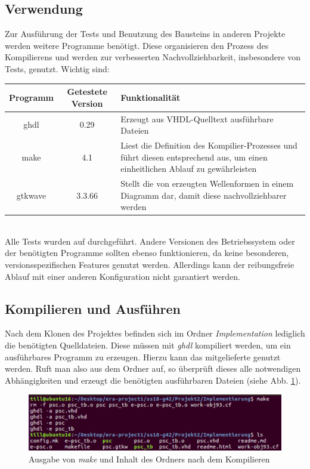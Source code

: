 \documentclass[a4paper]{article}
\begin{document}
   \subsection{Verwendung} \label{Verwendung}
   			Zur Ausführung der Tests und Benutzung des Bausteins in anderen Projekte werden weitere Programme benötigt. Diese organisieren den Prozess des Kompilierens und werden zur verbesserten Nachvollziehbarkeit, insbesondere von Tests, genutzt.
   			Wichtig sind:\\
   			
   			\begin{tabular}{c | c | p{60mm}}
   				Programm & Getestete Version & Funktionalität\\
   				\hline
   				ghdl & 0.29 & Erzeugt aus VHDL-Quelltext ausführbare Dateien\\
   				make & 4.1 & Liest die Definition des Kompilier-Prozesses und führt diesen entsprechend aus, um einen einheitlichen Ablauf zu gewährleisten\\
   				gtkwave & 3.3.66 & Stellt die von \codeword{ghdl} erzeugten Wellenformen in einem Diagramm dar, damit diese nachvollziehbarer werden\\
   			\end{tabular}
   			\\
   			
   			\noindent Alle Tests wurden auf  durchgeführt. Andere Versionen des Betriebssystem oder der benötigten Programme sollten ebenso funktionieren, da keine besonderen, versionsspezifischen Features genutzt werden. Allerdings kann der reibungsfreie Ablauf mit einer anderen Konfiguration nicht garantiert werden.
   			
   				
   		\subsection{Kompilieren und Ausführen}
   			Nach dem Klonen des Projektes befinden sich im Ordner \emph{Implementation} lediglich die benötigten Quelldateien. Diese müssen mit \emph{ghdl} kompiliert werden, um ein ausführbares Programm zu erzeugen. Hierzu kann das mitgelieferte  genutzt werden. Ruft man also aus dem Ordner  auf, so überprüft dieses alle notwendigen Abhängigkeiten und erzeugt die benötigten ausführbaren Dateien (siehe Abb. \ref{fig:screenshot001}).
   			
   			\begin{figure}[hb]
   				\centering
   				\includegraphics[width=0.7\linewidth]{images/screenshot001}
   				\caption{Ausgabe von \emph{make} und Inhalt des Ordners nach dem Kompilieren}
   				\label{fig:screenshot001}
   			\end{figure}
   			
\end{document}
